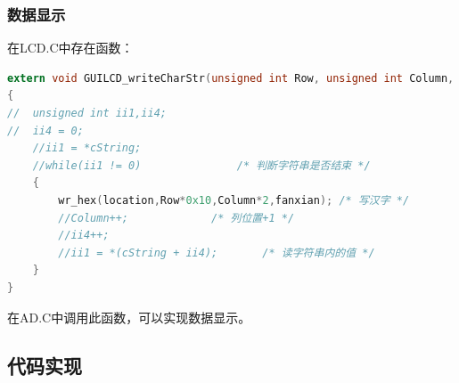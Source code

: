 \documentclass[12pt]{article}
\begin{document}
\subsubsection{数据显示}
在LCD.C中存在函数：
\begin{lstlisting}[language=C]
extern void GUILCD_writeCharStr(unsigned int Row, unsigned int Column, unsigned int location ,unsigned short fanxian)
{
//	unsigned int ii1,ii4;
//	ii4 = 0;
	//ii1 = *cString;
	//while(ii1 != 0)				/* 判断字符串是否结束 */
	{
		wr_hex(location,Row*0x10,Column*2,fanxian);	/* 写汉字 */
		//Column++;				/* 列位置+1 */
		//ii4++;
		//ii1 = *(cString + ii4);		/* 读字符串内的值 */
	}
}
\end{lstlisting}
在AD.C中调用此函数，可以实现数据显示。
\subsection{代码实现}
\end{document}
